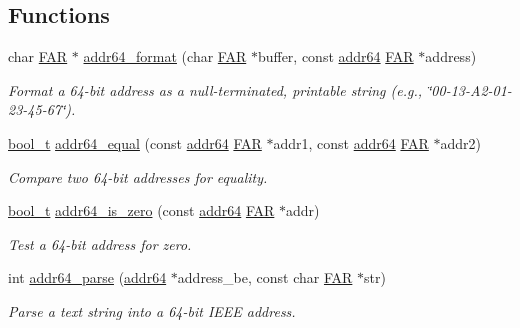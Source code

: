 \subsection*{Functions}
\begin{DoxyCompactItemize}
\item 
char \hyperlink{group__hal_gaef060b3456fdcc093a7210a762d5f2ed}{F\+AR} $\ast$ \hyperlink{group__wpan__types_ga448782f4aed0821758969b47221417ed}{addr64\+\_\+format} (char \hyperlink{group__hal_gaef060b3456fdcc093a7210a762d5f2ed}{F\+AR} $\ast$buffer, const \hyperlink{unionaddr64}{addr64} \hyperlink{group__hal_gaef060b3456fdcc093a7210a762d5f2ed}{F\+AR} $\ast$address)
\begin{DoxyCompactList}\small\item\em Format a 64-\/bit address as a null-\/terminated, printable string (e.\+g., \char`\"{}00-\/13-\/\+A2-\/01-\/23-\/45-\/67\char`\"{}). \end{DoxyCompactList}\item 
\hyperlink{group__hal__dos_ga04dd5074964518403bf944f2b240a5f8}{bool\+\_\+t} \hyperlink{group__wpan__types_ga2f0706c06dc9bdcb918b55635dcd9b6f}{addr64\+\_\+equal} (const \hyperlink{unionaddr64}{addr64} \hyperlink{group__hal_gaef060b3456fdcc093a7210a762d5f2ed}{F\+AR} $\ast$addr1, const \hyperlink{unionaddr64}{addr64} \hyperlink{group__hal_gaef060b3456fdcc093a7210a762d5f2ed}{F\+AR} $\ast$addr2)
\begin{DoxyCompactList}\small\item\em Compare two 64-\/bit addresses for equality. \end{DoxyCompactList}\item 
\hyperlink{group__hal__dos_ga04dd5074964518403bf944f2b240a5f8}{bool\+\_\+t} \hyperlink{group__wpan__types_ga9795dea7f415ceb7502f39a78ebadfc1}{addr64\+\_\+is\+\_\+zero} (const \hyperlink{unionaddr64}{addr64} \hyperlink{group__hal_gaef060b3456fdcc093a7210a762d5f2ed}{F\+AR} $\ast$addr)
\begin{DoxyCompactList}\small\item\em Test a 64-\/bit address for zero. \end{DoxyCompactList}\item 
int \hyperlink{group__wpan__types_ga500b175732df9779b3670e2ba1402530}{addr64\+\_\+parse} (\hyperlink{unionaddr64}{addr64} $\ast$address\+\_\+be, const char \hyperlink{group__hal_gaef060b3456fdcc093a7210a762d5f2ed}{F\+AR} $\ast$str)
\begin{DoxyCompactList}\small\item\em Parse a text string into a 64-\/bit I\+E\+EE address. \end{DoxyCompactList}\end{DoxyCompactItemize}
